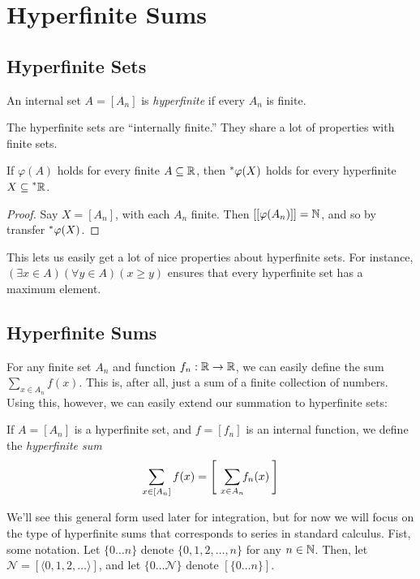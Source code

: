 \section{Hyperfinite Sums}
\subsection{Hyperfinite Sets}
\begin{defn}
    An internal set $A = [A_n]$ is \textit{hyperfinite} if every $A_n$ is finite.
\end{defn}

The hyperfinite sets are ``internally finite.'' They share a lot of properties with finite sets.

\begin{thm}\label{HyperfiniteTransfer}
    If $\varphi(A)$ holds for every finite $A \subseteq \mathbb{R}$, then $\prescript{*}{}{\varphi}(X)$ holds for every hyperfinite $X \subseteq \prescript{*}{}{\mathbb{R}}$.
\end{thm}

\begin{proof}
    Say $X = [A_n]$, with each $A_n$ finite. Then $[[\varphi(A_n)]] = \mathbb{N}$, and so by transfer $\prescript{*}{}{\varphi}(X)$.
\end{proof}

This lets us easily get a lot of nice properties about hyperfinite sets. For instance, $(\exists x \in A)(\forall y \in A) (x \geq y)$ ensures that every hyperfinite set has a maximum element.

\subsection{Hyperfinite Sums}
For any finite set $A_n$ and function $f_n: \mathbb{R} \to \mathbb{R}$, we can easily define the sum $\sum_{x \in A_n} f(x)$. This is, after all, just a sum of a finite collection of numbers. Using this, however, we can easily extend our summation to hyperfinite sets:

\begin{defn}
    If $A = [A_n]$ is a hyperfinite set, and $f = [f_n]$ is an internal function, we define the \textit{hyperfinite sum}
    \[\sum_{x \in [A_n]} f(x) = \left[\ \ \sum_{\mathclap{x \in A_n}} f_n(x) \:\right]\] %
\end{defn}

We'll see this general form used later for integration, but for now we will focus on the type of hyperfinite sums that corresponds to series in standard calculus. Fist, some notation. Let $\{0\ldots n\}$ denote $\{0, 1, 2, \ldots, n\}$ for any $n \in \mathbb{N}$. Then, let $\mathscr{N} = [\langle 0, 1, 2, \ldots \rangle]$, and let $\{0\ldots\mathscr{N}\}$ denote $[\{0\ldots n\}]$.

